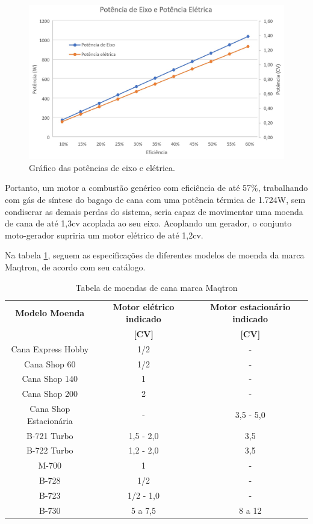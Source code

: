 \begin{figure}[!htb]
	\centering
	\includegraphics[width=14cm]{Figuras/grafico_potencia_eficiencia_2}
	\caption{Gráfico das potências de eixo e elétrica.}
	\label{grafico_potencia_eficiencia}
\end{figure}



Portanto, um motor a combustão genérico com eficiência de até 57\%, trabalhando com gás de síntese do bagaço de cana com uma potência térmica de 1.724W, sem condiserar as demais perdas do sistema, seria capaz de movimentar uma moenda de cana de até 1,3cv acoplada ao seu eixo. Acoplando um gerador, o conjunto moto-gerador supriria um motor elétrico de até 1,2cv.

Na tabela \ref{tabela_moendas}, seguem as especificações de diferentes modelos de moenda da marca Maqtron, de acordo com seu catálogo.

\begin{table}[h]
	\centering
	\caption{Tabela de moendas de cana marca Maqtron \cite{catalogo2016}}
	\begin{tabular}{|c|c|c|}
	\hline
	\rowcolor{lightgray}\textbf{Modelo Moenda} & \textbf{Motor elétrico indicado} & \textbf{Motor estacionário indicado} \\
	\rowcolor{lightgray} & \textbf{[CV]} & \textbf{[CV]} \\
	\hline
	Cana Express Hobby & 1/2 & - \\
	Cana Shop 60 & 1/2 & - \\
	Cana Shop 140 & 1 & - \\
	Cana Shop 200 & 2 & - \\
	Cana Shop Estacionária & - & 3,5 - 5,0 \\
	B-721 Turbo & 1,5 - 2,0 & 3,5 \\
	B-722 Turbo & 1,2 - 2,0 & 3,5 \\
	M-700 & 1 & - \\
	B-728 & 1/2 & - \\
	B-723 & 1/2 - 1,0 & - \\
	B-730 & 5 a 7,5 & 8 a 12 \\
	\hline
	\end{tabular}
	\label{tabela_moendas}
\end{table}	

